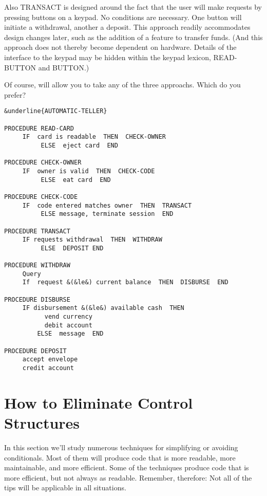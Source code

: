 Also TRANSACT is designed around the fact that the user will
make requests by pressing buttons on a keypad. No conditions are
necessary. One button will initiate a withdrawal, another a deposit. This
approach readily accommodates design changes later, such as the addition
of a feature to transfer funds. (And this approach does not thereby
become dependent on hardware. Details of the interface to the keypad
may be hidden within the keypad lexicon, READ-BUTTON and
BUTTON.)

Of course, \Forth{} will allow you to take any of the three approachs.
Which do you prefer?

\begin{figure*}[tp]
\small\begin{center}
\begin{BVerbatim}[commandchars=\&\{\},baselinestretch=0.85]
&underline{AUTOMATIC-TELLER}

PROCEDURE READ-CARD
     IF  card is readable  THEN  CHECK-OWNER
          ELSE  eject card  END

PROCEDURE CHECK-OWNER
     IF  owner is valid  THEN  CHECK-CODE
          ELSE  eat card  END

PROCEDURE CHECK-CODE
     IF  code entered matches owner  THEN  TRANSACT
          ELSE message, terminate session  END

PROCEDURE TRANSACT
     IF requests withdrawal  THEN  WITHDRAW
          ELSE  DEPOSIT END

PROCEDURE WITHDRAW
     Query
     If  request &(&le&) current balance  THEN  DISBURSE  END

PROCEDURE DISBURSE
     IF disbursement &(&le&) available cash  THEN
           vend currency
           debit account
         ELSE  message  END

PROCEDURE DEPOSIT
     accept envelope
     credit account
\end{BVerbatim}
\end{center}
\end{figure*}

\section{How to Eliminate Control Structures}
In this section we'll study numerous techniques for simplifying or
avoiding conditionals. Most of them will produce code that is more
readable, more maintainable, and more efficient. Some of the techniques
produce code that is more efficient, but not always as readable.
Remember, therefore: Not all of the tips will be applicable in all
situations.

